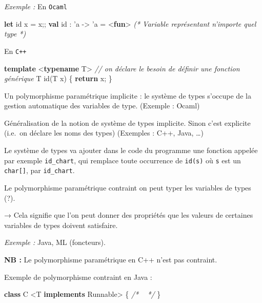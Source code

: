 \documentclass[]{article}
\newenvironment{Shaded}{}{}
\newcommand{\KeywordTok}[1]{\textcolor[rgb]{0.00,0.44,0.13}{\textbf{#1}}}
\newcommand{\CommentTok}[1]{\textcolor[rgb]{0.38,0.63,0.69}{\textit{#1}}}
\newcommand{\ControlFlowTok}[1]{\textcolor[rgb]{0.00,0.44,0.13}{\textbf{#1}}}
\newcommand{\BuiltInTok}[1]{#1}
\newcommand{\NormalTok}[1]{#1}
\begin{document}
\emph{Exemple :} En \texttt{Ocaml}

\begin{Shaded}
\begin{Highlighting}[]
\KeywordTok{let}\NormalTok{ id x = x;;}
    \KeywordTok{val}\NormalTok{ id : 'a -> 'a = <}\KeywordTok{fun}\NormalTok{> }\CommentTok{(* Variable représentant n'importe quel type *)}
\end{Highlighting}
\end{Shaded}

En \texttt{C++}

\begin{Shaded}
\begin{Highlighting}[]
\KeywordTok{template}\NormalTok{ <}\KeywordTok{typename}\NormalTok{ T> }\CommentTok{// on déclare le besoin de définir une fonction générique}
\NormalTok{T id(T x) \{}
    \ControlFlowTok{return}\NormalTok{ x;}
\NormalTok{\}}
\end{Highlighting}
\end{Shaded}

Un polymorphisme paramétrique implicite : le système de types s'occupe
de la gestion automatique des variables de type. (Exemple : Ocaml)

Généralisation de la notion de système de types implicite. Sinon c'est
explicite (i.e.~on déclare les noms des types) (Exemples : C++, Java,
\dots)

Le système de types va ajouter dans le code du programme une fonction
appelée par exemple \texttt{id\_chart}, qui remplace toute occurrence de
\texttt{id(s)} où \texttt{s} est un \texttt{char{[}{]}}, par
\texttt{id\_chart}.

Le polymorphisme paramétrique contraint on peut typer les variables de
types (?).

→ Cela signifie que l'on peut donner des propriétés que les valeurs de
certaines variables de types doivent satisfaire.

\emph{Exemple :} Java, ML (foncteurs).

\textbf{NB :} Le polymorphisme paramétrique en C++ n'est pas contraint.

Exemple de polymorphisme contraint en Java :

\begin{Shaded}
\begin{Highlighting}[]
\KeywordTok{class}\NormalTok{ C <T }\KeywordTok{implements} \BuiltInTok{Runnable}\NormalTok{> \{}
    \CommentTok{/* ~ */}
\NormalTok{\}}
\end{Highlighting}
\end{Shaded}
\end{document}
